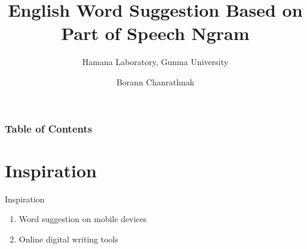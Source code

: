 \documentclass{beamer}
\title{English Word Suggestion Based on Part of Speech Ngram}
\subtitle{Hamana Laboratory, Gunma University}
\author{Borann Chanrathnak}
\begin{document}
\maketitle


\begin{frame}
\frametitle{Table of Contents}
\tableofcontents
\end{frame}

\section{Inspiration}
\begin{frame}{Inspiration}
    \begin{enumerate}
        \item Word suggestion on mobile devices
        \item Online digital writing tools
    \end{enumerate}
    \centering
\end{frame}
\end{document}

